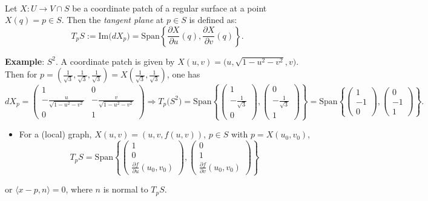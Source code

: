 \\
Let $X: U\to V\cap S$ be a coordinate patch of a regular surface at a point $X(q) = p\in S$. Then the \textit{tangent plane} at $p\in S$ is defined as:
\[
T_pS := \mathrm{Im}\big(dX_p\big) = \mathrm{Span}\left\{\frac{\partial X}{\partial u}(q), \frac{\partial X}{\partial v}(q)\right\}.
\]

\noindent\textbf{Example}: $S^2$. A coordinate patch is given by $X(u, v) = \big(u, \sqrt{1 - u^2 - v^2}, v\big)$. Then for $p = \left(\frac{1}{\sqrt{3}}, \frac{1}{\sqrt{3}}, \frac{1}{\sqrt{3}}\right) = X\left(\frac{1}{\sqrt{3}}, \frac{1}{\sqrt{3}}\right)$, one has
\[
dX_p = \begin{pmatrix}1 & 0\\ -\frac{u}{\sqrt{1-u^2-v^2}} & -\frac{v}{\sqrt{1-u^2-v^2}}\\ 0 & 1\end{pmatrix}
\Rightarrow T_p\big(S^2\big) = \mathrm{Span}\left\{\begin{pmatrix}1\\ -\frac{1}{\sqrt{3}}\\ 0\end{pmatrix}, \begin{pmatrix}0\\ -\frac{1}{\sqrt{3}}\\ 1\end{pmatrix}\right\} = \mathrm{Span}\left\{\begin{pmatrix}1\\ -1\\ 0\end{pmatrix}, \begin{pmatrix}0\\ -1\\ 1\end{pmatrix}\right\}.
\]

\noindent\begin{itemize}
\item For a (local) graph, $X(u, v) = (u, v, f(u, v))$, $p\in S$ with $p = X(u_0, v_0)$,
\[
T_pS = \mathrm{Span}\left\{\begin{pmatrix}1\\ 0\\ \frac{\partial f}{\partial u}(u_0, v_0)\end{pmatrix}, \begin{pmatrix}0\\ 1\\ \frac{\partial f}{\partial v}(u_0, v_0)\end{pmatrix}\right\}
\]
\end{itemize}
\noindent or $\langle x - p, n\rangle = 0$, where $n$ is normal to $T_pS$.

